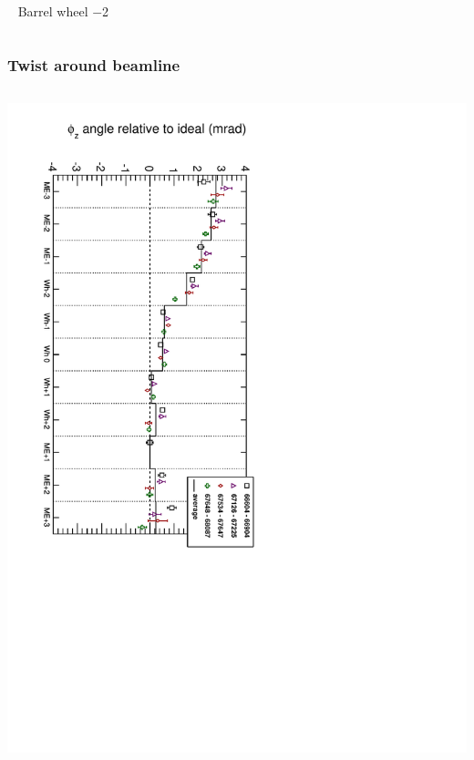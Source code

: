 \documentclass[compress]{beamer}
\begin{document}
\begin{frame}
\begin{columns}
\mbox{ } \hfill \scriptsize Barrel wheel $-$2 \hfill \mbox{ }

\end{columns}
\end{frame}

\begin{frame}
\frametitle{Twist around beamline}
\begin{columns}
\includegraphics[height=1.25\linewidth, angle=90]{alierr_phiz.pdf}


\end{columns}
\end{frame}
\end{document}
